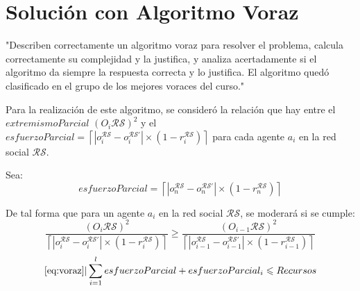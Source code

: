 \documentclass[letterpaper,10pt]{article}
\begin{document}
\section{Solución con Algoritmo Voraz}
\label{sec:algoritmo_voraz}
"Describen correctamente un algoritmo voraz para resolver el problema, calcula correctamente su complejidad y la justifica, y analiza acertadamente si el algoritmo da siempre la respuesta correcta y lo justifica. El algoritmo quedó clasificado en el grupo de los mejores voraces del curso."

Para la realización de este algoritmo, se consideró la relación que hay entre el $extremismoParcial$ $(O_i\mathcal{R} \mathcal{S})^2$ y el $esfuerzoParcial = \left\lceil  |o_i^{\mathcal{R}\mathcal{S}} - o_i^{\mathcal{R}\mathcal{S}'}| \times (1 - r_i^{\mathcal{R}\mathcal{S}}) \right\rceil$ para cada agente $a_i$ en la red social $\mathcal{R}\mathcal{S}$.

Sea:
\[
  esfuerzoParcial = \left\lceil  |o_n^{\mathcal{R}\mathcal{S}} - o_n^{\mathcal{R}\mathcal{S}'}| \times (1 - r_n^{\mathcal{R}\mathcal{S}}) \right\rceil
\]

De tal forma que para un agente $a_i$ en la red social $\mathcal{R}\mathcal{S}$, se moderará si se cumple:
\begin{equation}
  \frac{(O_i\mathcal{R} \mathcal{S})^2}{\left\lceil  |o_i^{\mathcal{R}\mathcal{S}} - o_i^{\mathcal{R}\mathcal{S}'}| \times (1 - r_i^{\mathcal{R}\mathcal{S}}) \right\rceil} \geqslant  \frac{(O_{i-1} \mathcal{R} \mathcal{S})^2}{\left\lceil  |o_{i-1}^{\mathcal{R}\mathcal{S}} - o_{i-1}^{\mathcal{R}\mathcal{S}'}| \times (1 - r_{i-1}^{\mathcal{R}\mathcal{S}}) \right\rceil}
  \label{eq:voraz}
\end{equation}
\begin{equation}
  \eqref{eq:voraz} | \sum_{i=1}^{l}esfuerzoParcial + esfuerzoParcial_i \leqslant Recursos
  \label{eq:voraz2}
\end{equation}
\end{document}
